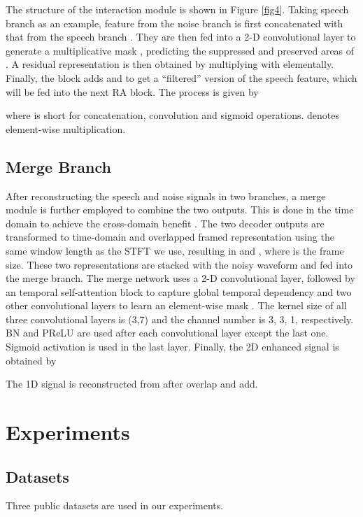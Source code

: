 \documentclass[letterpaper]{article} \usepackage{snnet}  \usepackage{times}  \usepackage{helvet} \usepackage{courier}  \usepackage[hyphens]{url}  \usepackage{graphicx} \urlstyle{rm} \def\UrlFont{\rm}  \usepackage{graphicx}  \usepackage{natbib}  \usepackage{caption} \usepackage{amsfonts}  \usepackage{amsmath}  \usepackage{multirow} \usepackage{tablefootnote}  \usepackage[switch]{lineno}
\begin{document}
The structure of the interaction module is shown in Figure \ref{fig4}. Taking speech branch as an example, feature from the noise branch  is first concatenated with that from the speech branch . They are then fed into a 2-D convolutional layer to generate a multiplicative mask , predicting the suppressed and preserved areas of . A residual representation  is then obtained by multiplying  with  elementally. Finally, the block adds  and  to get a “filtered” version of the speech feature, which will be fed into the next RA block. The process is given by

where  is short for concatenation, convolution and sigmoid operations.  denotes element-wise multiplication.

\subsection{Merge Branch}

\noindent After reconstructing the speech and noise signals in two branches, a merge module is further employed to combine the two outputs. This is done in the time domain to achieve the cross-domain benefit \cite{Kim2018MDPhD}. The two decoder outputs are transformed to time-domain and overlapped framed representation using the same window length as the STFT we use, resulting in  and , where  is the frame size. These two representations are stacked with the noisy waveform  and fed into the merge branch. The merge network uses a 2-D convolutional layer, followed by an temporal self-attention block to capture global temporal dependency and two other convolutional layers to learn an element-wise mask . The kernel size of all three convolutional layers is (3,7) and the channel number is 3, 3, 1, respectively. BN and PReLU are used after each convolutional layer except the last one. Sigmoid activation is used in the last layer. Finally, the 2D enhanced signal is obtained by

The 1D signal is reconstructed from  after overlap and add.

\section{Experiments}

\subsection{Datasets}

\noindent Three public datasets are used in our experiments.
\end{document}

